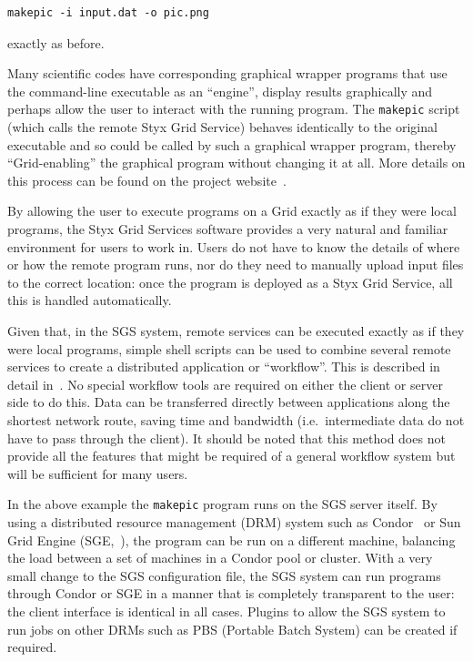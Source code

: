 \documentclass[times,10pt,twocolumn]{article}
\begin{document}
\begin{verbatim}
makepic -i input.dat -o pic.png
\end{verbatim}

\noindent exactly as before.

Many scientific codes have corresponding graphical wrapper programs that use the command-line executable as an ``engine'', display results graphically and perhaps allow the user to interact with the running program.  The {\tt makepic} script (which calls the remote Styx Grid Service) behaves identically to the original executable and so could be called by such a graphical wrapper program, thereby ``Grid-enabling'' the graphical program without changing it at all.  More details on this process can be found on the project website~\cite{sgswebsite}.

By allowing the user to execute programs on a Grid exactly as if they were local programs, the Styx Grid Services software provides a very natural and familiar environment for users to work in.  Users do not have to know the details of where or how the remote program runs, nor do they need to manually upload input files to the correct location: once the program is deployed as a Styx Grid Service, all this is handled automatically.

Given that, in the SGS system, remote services can be executed exactly as if they were local programs, simple shell scripts can be used to combine several remote services to create a distributed application or ``workflow''.  This is described in detail in~\cite{blower:2006}.  No special workflow tools are required on either the client or server side to do this.  Data can be transferred directly between applications along the shortest network route, saving time and bandwidth (i.e.\ intermediate data do not have to pass through the client).  It should be noted that this method does not provide all the features that might be required of a general workflow system but will be sufficient for many users.

\label{sec:condor_sge}
In the above example the {\tt makepic} program runs on the SGS server itself.  By using a distributed resource management (DRM) system such as Condor~\cite{condor} or Sun Grid Engine (SGE,~\cite{sungridengine}), the program can be run on a different machine, balancing the load between a set of machines in a Condor pool or cluster.  With a very small change to the SGS configuration file, the SGS system can run programs through Condor or SGE in a manner that is completely transparent to the user: the client interface is identical in all cases.  Plugins to allow the SGS system to run jobs on other DRMs such as PBS (Portable Batch System) can be created if required.
\end{document}
